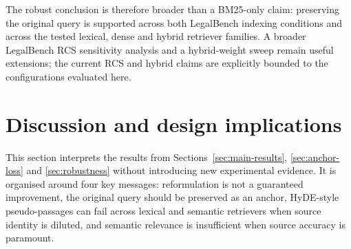 \documentclass[a4paper,fleqn]{cas-dc}
\begin{document}
\begin{table}[h]
\centering
\caption{Scope of robustness and ablation evidence in this study.}
\label{tab:ablation-status}
\end{table}

The robust conclusion is therefore broader than a BM25-only
claim: preserving the original query is supported across both
LegalBench indexing conditions and across the tested lexical,
dense and hybrid retriever families. A broader LegalBench RCS
sensitivity analysis and a hybrid-weight sweep remain useful
extensions; the current RCS and hybrid claims are explicitly
bounded to the configurations evaluated here.
\section{Discussion and design implications}
\label{sec:discussion}
This section interprets the results from Sections~\ref{sec:main-results}, \ref{sec:anchor-loss} and \ref{sec:robustness} without introducing new experimental evidence. It is organised around four key messages: reformulation is not a guaranteed improvement, the original query should be preserved as an anchor, HyDE-style pseudo-passages can fail across lexical and semantic retrievers when source identity is diluted, and semantic relevance is insufficient when source accuracy is paramount.
\end{document}
